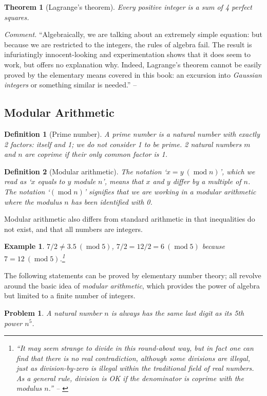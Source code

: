 \documentclass{article}
\numberwithin{equation}{section}
\newtheorem{definition}{Definition}[section]
\newtheorem{theorem}{Theorem}[section]
\newtheorem{example}{Example}[section]
\newtheorem{problem}{Problem}[section]
\begin{document}
\begin{theorem}[Lagrange's theorem]
	Every positive integer is a sum of 4 perfect squares.
\end{theorem}
\textit{Comment.} ``Algebraically, we are talking about an extremely simple equation: but because we are restricted to the integers, the rules of algebra fail. The result is infuriatingly innocent-looking and experimentation shows that it does seem to work, but offers no explanation why. Indeed, Lagrange's theorem cannot be easily proved by the elementary means covered in this book: an excursion into \textit{Gaussian integers} or something similar is needed.'' -- \cite[Chap. 2, p. 9]{Tao2006}

\subsection{Modular Arithmetic}
\begin{definition}[Prime number]
	A \emph{prime number} is a natural number with exactly 2 factors: itself and 1; we do not consider 1 to be prime. 2 natural numbers $m$ and $n$ are \emph{coprime} if their only common factor is 1.
\end{definition}

\begin{definition}[Modular arithmetic]
	The notation `$x = y\ (\operatorname{mod} n)$', which we read as `$x$ equals to $y$ module $n$', means that $x$ and $y$ differ by a multiple of $n$. The notation `$(\operatorname{mod} n)$' signifies that we are working in a \emph{modular arithmetic} where the \emph{modulus $n$} has been identified with 0.
\end{definition}
Modular arithmetic also differs from standard arithmetic in that inequalities do not exist, and that all numbers are integers.

\begin{example}
	$7/2\ne 3.5\ (\operatorname{mod} 5)$, $7/2 = 12/2 = 6\ (\operatorname{mod} 5)$ because $7 = 12\ (\operatorname{mod} 5)$.\footnote{``It may seem strange to divide in this round-about way, but in fact one can find that there is no real contradiction, although some divisions are illegal, just as division-by-zero is illegal within the traditional field of real numbers. As a general rule, division is OK if the denominator is coprime with the modulus $n$.'' -- \cite[p. 10]{Tao2006}}
\end{example}
The following statements can be proved by elementary number theory; all revolve around the basic idea of \textit{modular arithmetic}, which provides the power of algebra but limited to a finite number of integers.
\begin{problem}
	A natural number $n$ is always has the same last digit as its 5th power $n^5$.
\end{problem}
\end{document}
